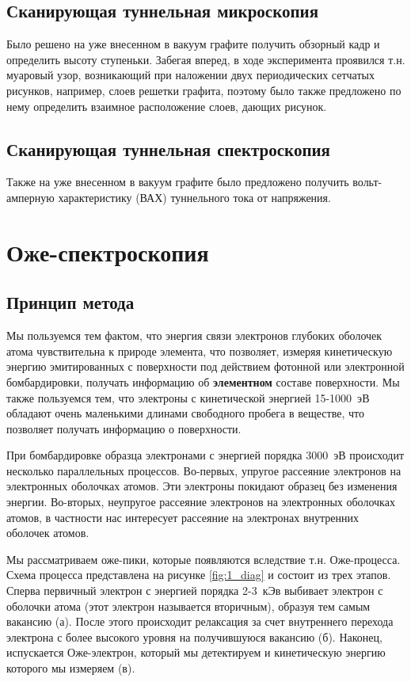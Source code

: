 \documentclass[a4paper, 12pt]{article}
\begin{document}
	\subsection{Сканирующая туннельная микроскопия}
	
	Было решено на уже внесенном в вакуум графите получить обзорный кадр и определить высоту ступеньки. Забегая вперед, в ходе эксперимента проявился т.н. муаровый узор, возникающий при наложении двух периодических сетчатых рисунков, например, слоев решетки графита, поэтому было также предложено по нему определить взаимное расположение слоев, дающих рисунок.
	
	\subsection{Сканирующая туннельная спектроскопия}
	
	Также на уже внесенном в вакуум графите было предложено получить вольт-амперную характеристику (ВАХ) туннельного тока от напряжения.
	
	\section{Оже-спектроскопия}
	
	\subsection{Принцип метода}
	
	Мы пользуемся тем фактом, что энергия связи электронов глубоких оболочек атома чувствительна к природе элемента, что позволяет, измеряя кинетическую энергию эмитированных с поверхности под действием фотонной или электронной бомбардировки, получать информацию об \textbf{элементном} составе поверхности. Мы также пользуемся тем, что электроны с кинетической энергией 15-1000~эВ обладают очень маленькими длинами свободного пробега в веществе, что позволяет получать информацию о поверхности.
	
	При бомбардировке образца электронами с энергией порядка 3000~эВ происходит несколько параллельных процессов. Во-первых, упругое рассеяние электронов на электронных оболочках атомов. Эти электроны покидают образец без изменения энергии. Во-вторых, неупругое рассеяние электронов на электронных оболочках атомов, в частности нас интересует рассеяние на электронах внутренних оболочек атомов.
	
	Мы рассматриваем оже-пики, которые появляются вследствие т.н. Оже-процесса. Схема процесса представлена на рисунке \ref{fig:1_diag} и состоит из трех этапов. Сперва первичный электрон с энергией порядка 2-3~кЭв выбивает электрон с оболочки атома (этот электрон называется вторичным), образуя тем самым вакансию (а). После этого происходит релаксация за счет внутреннего перехода электрона с более высокого уровня на получившуюся вакансию (б). Наконец, испускается Оже-электрон, который мы детектируем и кинетическую энергию которого мы измеряем (в).
	
\end{document}
